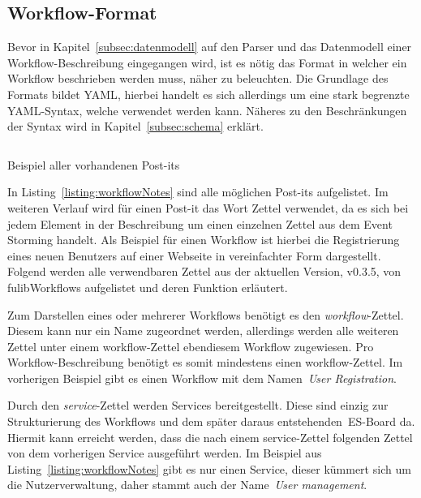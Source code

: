 \subsection{Workflow-Format}\label{subsec:workflow-format}
Bevor in Kapitel~\ref{subsec:datenmodell} auf den Parser und das Datenmodell einer Workflow-Beschreibung eingegangen wird,
ist es nötig das Format in welcher ein Workflow beschrieben werden muss, näher zu beleuchten.
Die Grundlage des Formats bildet \ac{YAML}, hierbei handelt es sich allerdings um eine stark begrenzte YAML-Syntax, welche verwendet werden kann.
Näheres zu den Beschränkungen der Syntax wird in Kapitel~\ref{subsec:schema} erklärt.

\begin{listing}[!ht]
    \inputminted{yaml}{listings/3.1.1/allNotes.es.yaml}
    \caption{Beispiel aller vorhandenen Post-its\textsuperscript{\textregistered}}
    \label{listing:workflowNotes}
\end{listing}

In Listing~\ref{listing:workflowNotes} sind alle möglichen Post-its\textsuperscript{\textregistered} aufgelistet.
Im weiteren Verlauf wird für einen Post-it\textsuperscript{\textregistered} das Wort Zettel verwendet, da es sich bei jedem Element in der Beschreibung um einen einzelnen Zettel aus dem Event Storming handelt.
Als Beispiel für einen Workflow ist hierbei die Registrierung eines neuen Benutzers auf einer Webseite in vereinfachter Form dargestellt.
Folgend werden alle verwendbaren Zettel aus der aktuellen Version, v0.3.5, von fulibWorkflows aufgelistet und deren Funktion erläutert.


Zum Darstellen eines oder mehrerer Workflows benötigt es den \textit{workflow}-Zettel.
Diesem kann nur ein Name zugeordnet werden, allerdings werden alle weiteren Zettel unter einem workflow-Zettel ebendiesem Workflow zugewiesen.
Pro Workflow-Beschreibung benötigt es somit mindestens einen workflow-Zettel.
Im vorherigen Beispiel gibt es einen Workflow mit dem Namen~\textit{User Registration}.


Durch den \textit{service}-Zettel werden Services bereitgestellt.
Diese sind einzig zur Strukturierung des Workflows und dem später daraus entstehenden~\ac{ES}-Board da.
Hiermit kann erreicht werden, dass die nach einem service-Zettel folgenden Zettel von dem vorherigen Service ausgeführt werden.
Im Beispiel aus Listing~\ref{listing:workflowNotes} gibt es nur einen Service, dieser kümmert sich um die Nutzerverwaltung, daher
stammt auch der Name~\textit{User management}.

